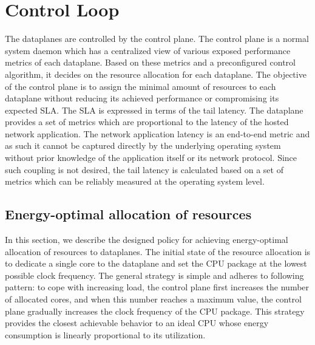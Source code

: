 \section{Control Loop}

The dataplanes are controlled by the control plane.
The control plane is a normal system daemon which has a centralized view of various exposed performance metrics of each dataplane.
Based on these metrics and a preconfigured control algorithm, it decides on the resource allocation for each dataplane.
The objective of the control plane is to assign the minimal amount of resources to each dataplane without reducing its achieved performance or compromising its expected SLA.
The SLA is expressed in terms of the tail latency.
The dataplane provides a set of metrics which are proportional to the latency of the hosted network application.
The network application latency is an end-to-end metric and as such it cannot be captured directly by the underlying operating system without prior knowledge of the application itself or its network protocol.
Since such coupling is not desired, the tail latency is calculated based on a set of metrics which can be reliably measured at the operating system level.

\subsection{Energy-optimal allocation of resources}

In this section, we describe the designed policy for achieving energy-optimal allocation of resources to dataplanes.
The initial state of the resource allocation is to dedicate a single core to the dataplane and set the CPU package at the lowest possible clock frequency.
The general strategy is simple and adheres to following pattern: to cope with increasing load, the control plane first increases the number of allocated cores, and when this number reaches a maximum value, the control plane gradually increases the clock frequency of the CPU package.
This strategy provides the closest achievable behavior to an ideal CPU whose energy consumption is linearly proportional to its utilization.
